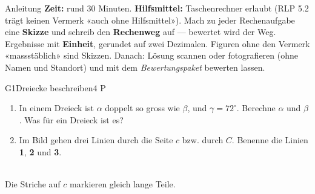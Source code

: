 \documentclass[11pt]{article}
\begin{document}

\begin{lpinfo}{Anleitung}
\textbf{Zeit:} rund 30 Minuten. \textbf{Hilfsmittel:} Taschenrechner erlaubt (RLP 5.2 trägt keinen Vermerk «auch ohne Hilfsmittel»).
Mach zu jeder Rechenaufgabe eine \textbf{Skizze} und schreib den \textbf{Rechenweg} auf — bewertet wird der Weg. Ergebnisse mit
\textbf{Einheit}, gerundet auf zwei Dezimalen. Figuren ohne den Vermerk «massstäblich» sind Skizzen.
Danach: Lösung scannen oder fotografieren (ohne Namen und Standort) und mit dem \emph{Bewertungspaket} bewerten lassen.
\end{lpinfo}


\begin{lpaufgabe}{G1}{Dreiecke beschreiben}{4 P}
\begin{minipage}[t]{0.55\linewidth}\vspace{0pt}
\begin{enumerate}[label=(\alph*),leftmargin=*,itemsep=2pt]
\item In einem Dreieck ist $\alpha$ doppelt so gross wie $\beta$, und $\gamma = 72^\circ$. Berechne $\alpha$ und $\beta$. Was für ein Dreieck ist es?
\item Im Bild gehen drei Linien durch die Seite $c$ bzw. durch $C$. Benenne die Linien \textbf{1}, \textbf{2} und \textbf{3}.
\end{enumerate}
\end{minipage}\hfill
\begin{minipage}[t]{0.42\linewidth}\vspace{0pt}\centering
{}\\[-2pt]{\footnotesize Die Striche auf $c$ markieren gleich lange Teile.}
\end{minipage}
\end{lpaufgabe}
\end{document}
